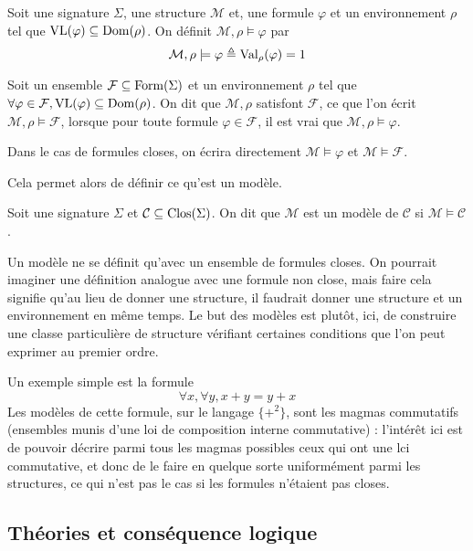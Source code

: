 \begin{definition}[Satisfaction]
  Soit une signature $\Sigma$, une structure $\mathcal M$ et, une formule
  $\varphi$ et un environnement $\rho$ tel que
  $\operatorname{VL}(\varphi)\subseteq\operatorname{Dom}(\rho)$.
  On définit $\mathcal M,\rho\models \varphi$ par
  \[\mathcal M,\rho\models \varphi \triangleq \operatorname{Val}_\rho(\varphi) = 1\]

  Soit un ensemble $\mathcal F\subseteq\operatorname{Form}(\Sigma)$ et un environnement
  $\rho$ tel que
  $\forall \varphi\in\mathcal F, \operatorname{VL}(\varphi)\subseteq\operatorname{Dom}(\rho)$.
  On dit que $\mathcal M,\rho$ satisfont $\mathcal F$, ce que l'on écrit
  $\mathcal M,\rho\models\mathcal F$, lorsque pour toute formule
  $\varphi\in\mathcal F$, il est vrai que $\mathcal M,\rho\models \varphi$.

  Dans le cas de formules closes, on écrira directement
  $\mathcal M\models\varphi$ et $\mathcal M\models \mathcal F$.
\end{definition}

Cela permet alors de définir ce qu'est un modèle.

\begin{definition}[Modèle]
  Soit une signature $\Sigma$ et $\mathcal C\subseteq\operatorname{Clos}(\Sigma)$. On dit que
  $\mathcal M$ est un modèle de $\mathcal C$ si $\mathcal M\models \mathcal C$.
\end{definition}

Un modèle ne se définit qu'avec un ensemble de formules closes. On pourrait
imaginer une définition analogue avec une formule non close, mais faire cela
signifie qu'au lieu de donner une structure, il faudrait donner une structure et
un environnement en même temps. Le but des modèles est plutôt, ici, de
construire une classe particulière de structure vérifiant certaines conditions
que l'on peut exprimer au premier ordre.

Un exemple simple est la formule
\[\forall x,\forall y, x + y = y + x\]
Les modèles de cette formule, sur le langage $\{+^2\}$, sont les magmas
commutatifs (ensembles munis d'une loi de composition interne commutative) :
l'intérêt ici est de pouvoir décrire parmi tous les magmas possibles ceux qui
ont une lci commutative, et donc de le faire en quelque sorte uniformément parmi
les structures, ce qui n'est pas le cas si les formules n'étaient pas closes.

\subsection{Théories et conséquence logique}

